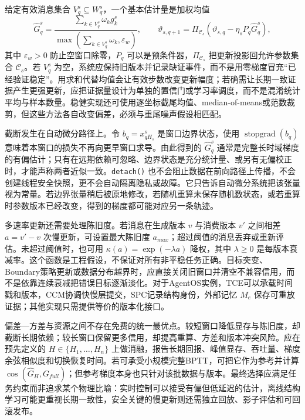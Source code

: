 给定有效消息集合 $V_q^s\subseteq W_q^s$，一个基本估计量是加权均值
\begin{equation}
 \widehat G_q^s=
 \frac{\sum_{k\in V_q^s}\omega_k g_k^s}
 {\max(\sum_{k\in V_q^s}\omega_k,\varepsilon_w)},
 \qquad
 \vartheta_{s,q+1}=\Pi_{\mathcal C_s}
 \left(\vartheta_{s,q}-\eta_s P_q\widehat G_q^s\right),
\end{equation}
其中 $\varepsilon_w>0$ 防止空窗口除零，$P_q$ 可以是预条件器，$\Pi_{\mathcal C_s}$ 把更新投影回允许参数集合 $\mathcal C_s$。若 $V_q^s$ 为空，系统应保持旧版本并记录缺证事件，而不是用零梯度冒充“已经验证稳定”。用求和代替均值会让有效步数改变更新幅度；若确需让长期一致证据产生更强更新，应把证据量设计为单独的置信门或学习率调度，而不是混淆统计平均与样本数量。稳健实现还可使用逐坐标截尾均值、median-of-means或范数裁剪，但这些方法各自改变偏差，必须与重尾噪声假设相匹配。

截断发生在自动微分路径上。令 $b_q=x_{qH_s}^s$ 是窗口边界状态，使用 $\operatorname{stopgrad}(b_q)$ 意味着本窗口的损失不再向更早窗口求导。由此得到的 $\widehat G_q^s$ 通常是完整长时域梯度的有偏估计；只有在远期依赖可忽略、边界状态是充分统计量、或另有无偏校正时，才能声称两者近似一致。\texttt{detach()} 也不会阻止数据在前向路径上传播，不会创建线程安全快照，更不会自动隔离隐私或故障。它只告诉自动微分系统把该张量视为常量。若边界张量稍后被原地修改，若随机重算未保存随机数状态，或若重算时参数版本已经改变，得到的梯度都可能对应另一条轨迹。

多速率更新还需要处理陈旧度。若消息在生成版本 $v$ 与消费版本 $v'$ 之间相差 $a=v'-v$ 次慢更新，可设置最大陈旧度 $a_{max}$；超过阈值的消息丢弃或重新评估。未超过阈值时，也可用 $\kappa(a)=\exp(-\lambda a)$ 降权，其中 $\lambda\geq0$ 是每版本衰减率。这个函数是工程假设，不保证对所有非平稳任务正确。目标突变、Boundary策略更新或数据分布越界时，应直接关闭旧窗口并清空不兼容信用，而不是依靠连续衰减把错误目标逐渐淡化。对于AgentOS实例，TCE可以承载时间戳和版本，CCM协调快慢层提交，SPC记录结构身份，外部记忆 $M_e$ 保存可重放证据；其他实现只需提供等价的版本化接口。

偏差—方差与资源之间不存在免费的统一最优点。较短窗口降低显存与陈旧度，却截断长期依赖；较长窗口保留更多信用，却提高重算、方差和版本冲突风险。应在预先定义的 $H\in\{H_1,\ldots,H_n\}$ 上做消融，报告长期回报、峰值显存、吞吐量、梯度余弦相似度和切换恢复时间。若可承受小规模完整BPTT，可把它作为参考并计算 $\cos(\widehat G_H,G_{full})$；但参考梯度本身也只针对该批数据与版本。最终选择应满足任务约束而非追求某个物理比喻：实时控制可以接受有偏但低延迟的估计，离线结构学习可能更重视长期一致性，安全关键的慢更新则还需独立回放、影子评估和可回滚发布。

